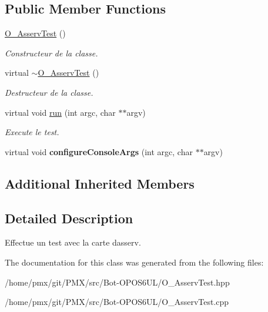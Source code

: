 \subsection*{Public Member Functions}
\begin{DoxyCompactItemize}
\item 
\mbox{\label{classO__AsservTest_ad31717ef99fb9f337ddb77eaa6c752bb}} 
\hyperlink{classO__AsservTest_ad31717ef99fb9f337ddb77eaa6c752bb}{O\+\_\+\+Asserv\+Test} ()
\begin{DoxyCompactList}\small\item\em Constructeur de la classe. \end{DoxyCompactList}\item 
\mbox{\label{classO__AsservTest_ae7bf8887324861021558b0b18ca34ad5}} 
virtual \hyperlink{classO__AsservTest_ae7bf8887324861021558b0b18ca34ad5}{$\sim$\+O\+\_\+\+Asserv\+Test} ()
\begin{DoxyCompactList}\small\item\em Destructeur de la classe. \end{DoxyCompactList}\item 
\mbox{\label{classO__AsservTest_a87e2ffa360e3e12ff5c7b81b1952a04f}} 
virtual void \hyperlink{classO__AsservTest_a87e2ffa360e3e12ff5c7b81b1952a04f}{run} (int argc, char $\ast$$\ast$argv)
\begin{DoxyCompactList}\small\item\em Execute le test. \end{DoxyCompactList}\item 
\mbox{\label{classO__AsservTest_adf7df1a0edd07b34b0ffb8eecb42e24a}} 
virtual void {\bfseries configure\+Console\+Args} (int argc, char $\ast$$\ast$argv)
\end{DoxyCompactItemize}
\subsection*{Additional Inherited Members}


\subsection{Detailed Description}
Effectue un test avec la carte d\textquotesingle{}asserv. 

The documentation for this class was generated from the following files\+:\begin{DoxyCompactItemize}
\item 
/home/pmx/git/\+P\+M\+X/src/\+Bot-\/\+O\+P\+O\+S6\+U\+L/O\+\_\+\+Asserv\+Test.\+hpp\item 
/home/pmx/git/\+P\+M\+X/src/\+Bot-\/\+O\+P\+O\+S6\+U\+L/O\+\_\+\+Asserv\+Test.\+cpp\end{DoxyCompactItemize}
